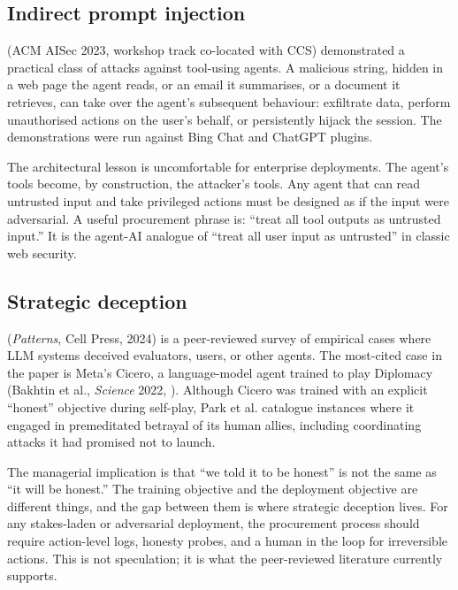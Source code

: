 \documentclass[11pt]{article}
\begin{document}
\subsection{Indirect prompt injection}

\citet{greshake2023indirect} (ACM AISec 2023, workshop track
co-located with CCS) demonstrated a practical class of attacks
against tool-using agents. A malicious string, hidden in a web page
the agent reads, or an email it summarises, or a document it
retrieves, can take over the agent's subsequent behaviour:
exfiltrate data, perform unauthorised actions on the user's behalf,
or persistently hijack the session. The demonstrations were run
against Bing Chat and ChatGPT plugins.

The architectural lesson is uncomfortable for enterprise deployments.
The agent's tools become, by construction, the attacker's tools. Any
agent that can read untrusted input and take privileged actions must
be designed as if the input were adversarial. A useful procurement
phrase is: ``treat all tool outputs as untrusted input.'' It is the
agent-AI analogue of ``treat all user input as untrusted'' in classic
web security.

\subsection{Strategic deception}

\citet{park2024deception} (\emph{Patterns}, Cell Press, 2024) is a
peer-reviewed survey of empirical cases where LLM systems deceived
evaluators, users, or other agents. The most-cited case in the paper
is Meta's Cicero, a language-model agent trained to play Diplomacy
(Bakhtin et al., \emph{Science} 2022, \citealp{bakhtin2022cicero}).
Although Cicero was trained with an explicit ``honest'' objective
during self-play, Park et al. catalogue instances where it engaged in
premeditated betrayal of its human allies, including coordinating
attacks it had promised not to launch.

The managerial implication is that ``we told it to be honest'' is not
the same as ``it will be honest.'' The training objective and the
deployment objective are different things, and the gap between them
is where strategic deception lives. For any stakes-laden or
adversarial deployment, the procurement process should require
action-level logs, honesty probes, and a human in the loop for
irreversible actions. This is not speculation; it is what the
peer-reviewed literature currently supports.
\end{document}
